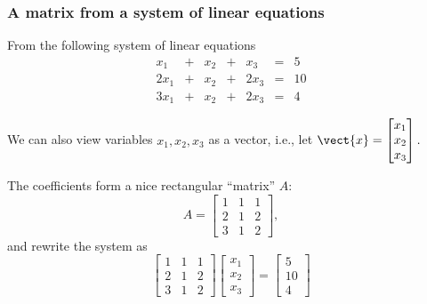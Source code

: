 \begin{frame}
  \frametitle{A matrix from a system of linear equations}
  {\small
  From the following system of linear equations
  \[
  \begin{array}{ccccccr}
    x_1 &+& x_2 &+& x_3 &=& 5\\
    2x_1 &+& x_2 &+& 2x_3 &=& 10\\
    3x_1 &+& x_2 &+& 2x_3 &=& 4
  \end{array}
  \]
  
  We can also view variables $x_1,x_2,x_3$ as a vector, i.e., let
  $  \vect{x} = 
  \begin{bmatrix}
    x_1\\
    x_2\\
    x_3
  \end{bmatrix}. $
  }
  
  \pause
  The coefficients form a nice rectangular ``matrix'' $A$:
  \[
  A =
  \begin{bmatrix}
    1 & 1 & 1 \\
    2 & 1 & 2 \\
    3 & 1 & 2
  \end{bmatrix},
  \]
  \pause
  and rewrite the system as
  \[
  \begin{bmatrix}
    1 & 1 & 1 \\
    2 & 1 & 2 \\
    3 & 1 & 2
  \end{bmatrix}
  \begin{bmatrix}
    x_1\\
    x_2\\
    x_3
  \end{bmatrix}
  =
  \begin{bmatrix}
    5\\
    10\\
    4
  \end{bmatrix}
  \]

  
\end{frame}

